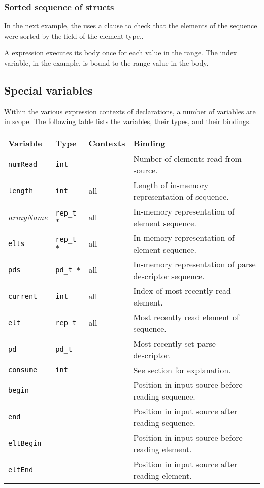\subsubsection{Sorted sequence of structs}
In the next example, the \Parray{}  uses a \Pwhere{}
clause to check that the elements of the sequence were sorted by the
 field of the element type..

%
\noindent
A \Pforall{} expression executes its body once for each value in the
range. The index variable,  in the example, is bound to the
range value in the body.

\subsection{Special variables}
\label{sec:special-variables}
Within the various expression contexts of \Parray{} declarations, a
number of variables are in scope.  The following table lists the
variables, their types, and their bindings.

\myvskip{1ex}
\begin{center}
\begin{tabular}{|l|l|l|l|}
\hline
Variable & Type & Contexts & Binding \\\hline \hline
\texttt{numRead}  & \texttt{int}     & \Pparsecheck{} & Number of elements read from source. \\ \hline
\texttt{length}   & \texttt{int}     & all & Length of in-memory representation of sequence.\\ \hline
\textit{arrayName}& \texttt{rep\_t *}& all & In-memory representation of element sequence. \\ \hline
\texttt{elts}     & \texttt{rep\_t *}& all & In-memory representation of element sequence. \\ \hline
\texttt{pds}      & \texttt{pd\_t *} & all & In-memory representation of parse descriptor sequence. \\ \hline
\texttt{current}  & \texttt{int}     & all & Index of most recently read element.  \\ \hline
\texttt{elt}      & \texttt{rep\_t}  & all & Most recently read element of sequence. \\ \hline
\texttt{pd}       & \texttt{pd\_t}   & \Pparsecheck{} & Most recently set  parse descriptor. \\ \hline
\texttt{consume}  & \texttt{int}     & \Pended{} & See \Pended{} section for explanation. \\ \hline
\texttt{begin}    & \Ppost{}         & \Pparsecheck{} & Position in input source before reading sequence. \\ \hline
\texttt{end}      & \Ppost{}         & \Pparsecheck{} & Position in input source after reading sequence. \\ \hline
\texttt{eltBegin}& \Ppost{}         & \Pparsecheck{} & Position in input source before reading element. \\ \hline
\texttt{eltEnd}  & \Ppost{}         & \Pparsecheck{} & Position in input source after reading element. \\ \hline
\end{tabular}
\end{center}
\myvskip{1ex}

